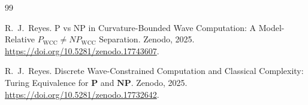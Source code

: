 \documentclass[11pt,a4paper]{article}
\begin{document}
\begin{thebibliography}{99}

R.~J.~Reyes.
\newblock P vs NP in Curvature-Bounded Wave Computation: A Model-Relative $P_{\mathrm{WCC}} \neq NP_{\mathrm{WCC}}$ Separation.
\newblock Zenodo, 2025.
\newblock \url{https://doi.org/10.5281/zenodo.17743607}.

R.~J.~Reyes.
\newblock Discrete Wave-Constrained Computation and Classical Complexity: Turing Equivalence for $\mathbf{P}$ and $\mathbf{NP}$.
\newblock Zenodo, 2025.
\newblock \url{https://doi.org/10.5281/zenodo.17732642}.

\end{thebibliography}
\end{document}
